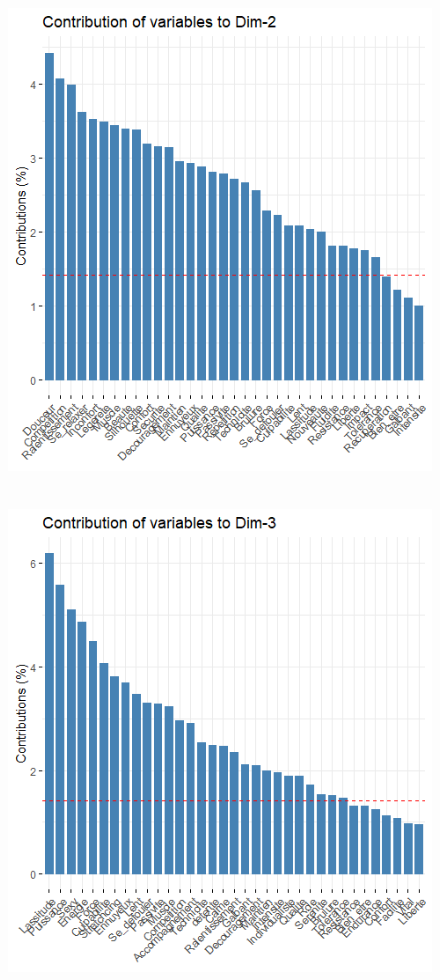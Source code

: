 \documentclass[12pt]{article}
\begin{document}
\begin{figure}[H]
\begin{center}
\includegraphics[scale=1.3]{ACP_3.png} 
\caption[]{\ }
\end{center}
\end{figure}


\begin{figure}[H]
\begin{center}
\includegraphics[scale=1.3]{ACP_4.png} 
\caption[]{\ }
\end{center}
\end{figure}
\end{document}
